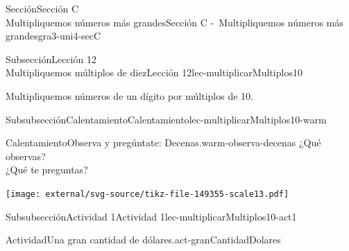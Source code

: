 %
%
\typeout{************************************************}
\typeout{************************************************}
%
\begin{sectionptx}{Sección}{{\Large Sección C\\}Multipliquemos números más grandes}{}{Sección C -~Multipliquemos números más grandes}{}{}{gra3-uni4-secC}
%
%
\typeout{************************************************}
\typeout{************************************************}
%
\begin{subsectionptx}{Subsección}{{\normalsize Lección 12\\[-0.05cm]}Multipliquemos múltiplos de diez}{}{Lección 12}{}{}{lec-multiplicarMultiplos10}
\begin{introduction}{}%
Multipliquemos números de un dígito por múltiplos de 10.%
\end{introduction}%
%
%
\typeout{************************************************}
\typeout{************************************************}
%
\begin{subsubsectionptx}{Subsubsección}{Calentamiento}{}{Calentamiento}{}{}{lec-multiplicarMultiplos10-warm}
\begin{exploration}{Calentamiento}{Observa y pregúntate: Decenas.}{warm-observa-decenas}%
¿Qué observas?\\
 ¿Qué te preguntas?%
\begin{image}{0}{1}{0}{}%
\texttt{[image: external/svg-source/tikz-file-149355-scale13.pdf]}
\end{image}%
\end{exploration}%
\end{subsubsectionptx}
%
%
\typeout{************************************************}
\typeout{************************************************}
%
\begin{subsubsectionptx}{Subsubsección}{Actividad 1}{}{Actividad 1}{}{}{lec-multiplicarMultiplos10-act1}
\begin{activity}{Actividad}{Una gran cantidad de dólares.}{act-granCantidadDolares}%

\end{activity}
\end{subsubsectionptx}
\end{subsectionptx}
\end{sectionptx}
